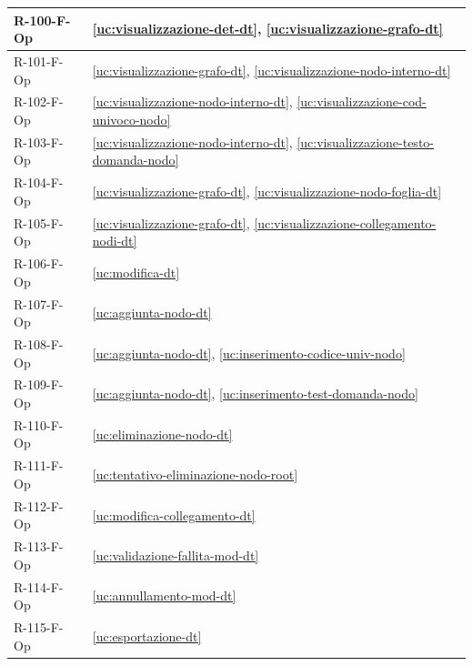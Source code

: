 ﻿\documentclass[a4paper,12pt]{article}
\begin{document}
{\begin{longtable}{|
      >{\centering\arraybackslash}p{}|
      >{\centering\arraybackslash}p{}|
      }
            R-100-F-Op       & \ref{uc:visualizzazione-det-dt}, \ref{uc:visualizzazione-grafo-dt}                 \\ \hline
            R-101-F-Op       & \ref{uc:visualizzazione-grafo-dt}, \ref{uc:visualizzazione-nodo-interno-dt}         \\ \hline
            R-102-F-Op       & \ref{uc:visualizzazione-nodo-interno-dt}, \ref{uc:visualizzazione-cod-univoco-nodo} \\ \hline
            R-103-F-Op       & \ref{uc:visualizzazione-nodo-interno-dt}, \ref{uc:visualizzazione-testo-domanda-nodo} \\ \hline
            R-104-F-Op       & \ref{uc:visualizzazione-grafo-dt}, \ref{uc:visualizzazione-nodo-foglia-dt}         \\ \hline
            R-105-F-Op       & \ref{uc:visualizzazione-grafo-dt}, \ref{uc:visualizzazione-collegamento-nodi-dt}         \\ \hline
            R-106-F-Op       & \ref{uc:modifica-dt}                                               \\ \hline
            R-107-F-Op       & \ref{uc:aggiunta-nodo-dt}                                               \\ \hline
            R-108-F-Op       & \ref{uc:aggiunta-nodo-dt}, \ref{uc:inserimento-codice-univ-nodo}                 \\ \hline
            R-109-F-Op       & \ref{uc:aggiunta-nodo-dt}, \ref{uc:inserimento-test-domanda-nodo}                 \\ \hline
            R-110-F-Op       & \ref{uc:eliminazione-nodo-dt}                                               \\ \hline
            R-111-F-Op      & \ref{uc:tentativo-eliminazione-nodo-root}                                               \\ \hline
            R-112-F-Op      & \ref{uc:modifica-collegamento-dt}                                               \\ \hline
            R-113-F-Op      & \ref{uc:validazione-fallita-mod-dt}                                               \\ \hline
            R-114-F-Op      & \ref{uc:annullamento-mod-dt}                                               \\ \hline
            R-115-F-Op      & \ref{uc:esportazione-dt}                                               \\ \hline
  \end{longtable}

}
\end{document}

